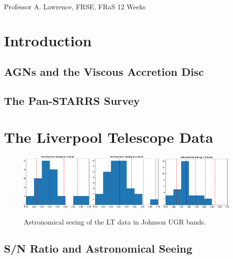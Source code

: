\documentclass[a4paper,11pt]{article}
\begin{document}
\vfill
{} Professor A. Lawrence, FRSE, FRaS
\hfill
12 Weeks

\newpage
\setcounter{page}{1} %
\tableofcontents
\newpage
\section{Introduction}
\subsection{AGNs and the Viscous Accretion Disc}
\cite{lawrence_2018}
\subsection{The Pan-STARRS Survey}
\cite{bruce_2017}

\section{The Liverpool Telescope Data}
\begin{figure}[h!]
    \includegraphics[width=0.32\textwidth]{seeing_hist_U_band.eps}
    \includegraphics[width=0.32\textwidth]{seeing_hist_G_band.eps}  \includegraphics[width=0.32\textwidth]{seeing_hist_R_band.eps}
    \caption{Astronomical seeing of the LT data in Johnson UGR bands.}
    \label{fig:seeing}
\end{figure}
\subsection{S/N Ratio and Astronomical Seeing}
\end{document}
